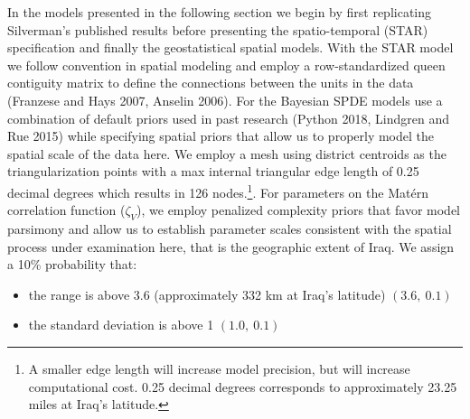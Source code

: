 \documentclass[12pt]{article}
\begin{document}
In the models presented in the following section we begin by first replicating Silverman's published results before presenting the spatio-temporal (STAR) specification and finally the geostatistical spatial models. With the STAR model we follow convention in spatial modeling and employ a row-standardized queen contiguity matrix to define the connections between the units in the data (Franzese and Hays 2007, Anselin 2006). For the Bayesian SPDE models use a combination of default priors used in past research (Python 2018, Lindgren and Rue 2015) while specifying spatial priors that allow us to properly model the spatial scale of the data here. We employ a mesh using district centroids as the triangularization points with a max internal triangular edge length of 0.25 decimal degrees which results in 126 nodes.\footnote{A smaller edge length will increase model precision, but will increase computational cost. 0.25 decimal degrees corresponds to approximately 23.25 miles at Iraq's latitude.}. For parameters on the Mat\'ern correlation function ($\zeta_V$), we employ penalized complexity priors that favor model parsimony and allow us to establish parameter scales consistent with the spatial process under examination here, that is the geographic extent of Iraq. We assign a 10\% probability that:

\begin{itemize}[noitemsep,nolistsep]
  \item the range is above 3.6 (approximately 332 km at Iraq's latitude) $(3.6,\ 0.1)$
  \item the standard deviation is above 1                                $(1.0,\ 0.1)$
\end{itemize}
\end{document}
